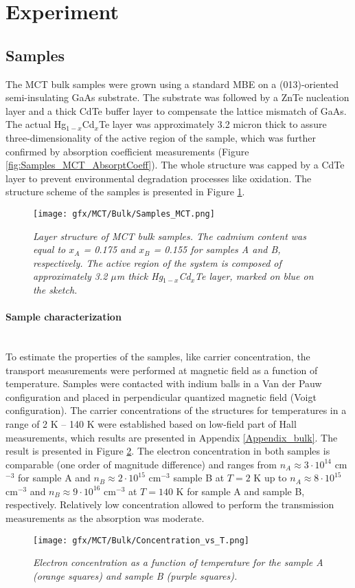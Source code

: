 \documentclass[titlepage,a4paper]{book}
\newcommand{\wciecie}{\quad\phantom{v}}
\newcommand{\myparagraph}[1]{\paragraph{#1}\mbox{}\\}
\begin{document}
\section{Experiment}
\subsection{Samples}
\wciecie
The MCT bulk samples were grown using a standard MBE on a (013)-oriented semi-insulating GaAs substrate. The substrate was followed by a ZnTe nucleation layer and a thick CdTe buffer layer to compensate the lattice mismatch of GaAs. The actual Hg$_{1-x}$Cd$_x$Te layer was approximately 3.2 micron thick to assure three-dimensionality of the active region of the sample, which was further confirmed by absorption coefficient measurements (Figure \ref{fig:Samples_MCT_AbsorptCoeff}). The whole structure was capped by a CdTe layer to prevent environmental degradation processes like oxidation. The structure scheme of the samples is presented in Figure \ref{fig:Samples_MCT}. 

\begin{figure}[ht]
	\centering
	\texttt{[image: gfx/MCT/Bulk/Samples\_MCT.png]}
	\vspace{-10pt}
	\caption{\textit{Layer structure of MCT bulk samples. The cadmium content was equal to $x_A$ = 0.175 and $x_B$ = 0.155 for samples A and B, respectively. The active region of the system is composed of approximately 3.2 $\mu$m thick Hg$_{1-x}$Cd$_x$Te layer, marked on blue on the sketch.}}
	\label{fig:Samples_MCT}
\end{figure} 

\myparagraph{Sample characterization}
\wciecie
To estimate the properties of the samples, like carrier concentration, the transport measurements were performed at magnetic field as a function of temperature. Samples were contacted with indium balls in a Van der Pauw configuration and placed in perpendicular quantized magnetic field (Voigt configuration). The carrier concentrations of the structures for temperatures in a range of 2 K -- 140 K were established based on low-field part of Hall measurements, which results are presented in Appendix \ref{Appendix_bulk}. The result is presented in Figure \ref{fig:Samples_MCT_Transport}. The electron concentration in both samples is comparable (one order of magnitude difference) and ranges from $n_A \approx 3 \cdot 10^{14}$ cm$^{-3}$ for sample A and $n_B \approx 2 \cdot 10^{15}$ cm$^{-3}$ sample B at $T = 2$ K up to $n_A \approx 8 \cdot 10^{15}$ cm$^{-3}$ and $n_B \approx 9 \cdot 10^{16}$ cm$^{-3}$ at $T = 140$ K for sample A and sample B, respectively. Relatively low concentration allowed to perform the transmission measurements as the absorption was moderate. 
\begin{figure}[ht]
	\centering
	\texttt{[image: gfx/MCT/Bulk/Concentration\_vs\_T.png]}
	\vspace{-10pt}
	\caption{\textit{Electron concentration as a function of temperature for the sample A (orange squares) and sample B (purple squares).}}
	\label{fig:Samples_MCT_Transport}
\end{figure} 
\end{document}
